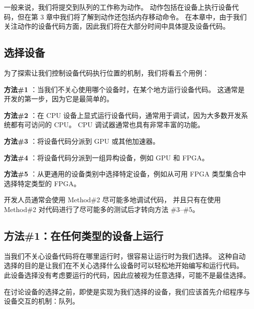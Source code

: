 一般来说，我们将提交到队列的工作称为动作。 
动作包括在设备上执行设备代码，但在第 3 章中我们将了解到动作还包括内存移动命令。 
在本章中，由于我们关注动作的设备代码方面，因此我们将在大部分时间中具体提及设备代码。

\subsection{选择设备}
为了探索让我们控制设备代码执行位置的机制，我们将看五个用例：

\textbf{方法\#1} ：当我们不关心使用哪个设备时，在某个地方运行设备代码。 这通常是开发的第一步，因为它是最简单的。

\textbf{方法\#2} ：在 CPU 设备上显式运行设备代码，通常用于调试，因为大多数开发系统都有可访问的 CPU。 
CPU 调试器通常也具有非常丰富的功能。

\textbf{方法\#3} ：将设备代码分派到 GPU 或其他加速器。

\textbf{方法\#4} ：将设备代码分派到一组异构设备，例如 GPU 和 FPGA。

\textbf{方法\#5} ：从更通用的设备类别中选择特定设备，例如从可用 FPGA 类型集合中选择特定类型的 FPGA。

\begin{remark}
	开发人员通常会使用 Method\#2 尽可能多地调试代码，
	并且只有在使用 Method\#2 对代码进行了尽可能多的测试后才转向方法 \#3–\#5。
\end{remark}

\subsection{方法\#1：在任何类型的设备上运行}
当我们不关心设备代码将在哪里运行时，很容易让运行时为我们选择。 
这种自动选择的目的是让我们在不关心选择什么设备时可以轻松地开始编写和运行代码。 
此设备选择没有考虑要运行的代码，因此应被视为任意选择，可能不是最佳选择。

在讨论设备的选择之前，即使是实现为我们选择的设备，我们应该首先介绍程序与设备交互的机制：队列。

